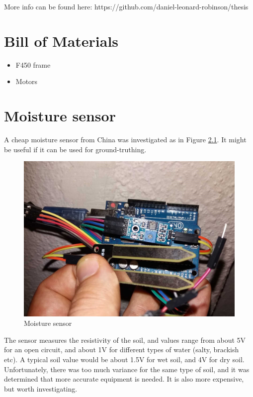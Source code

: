 \begin{appendices}

More info can be found here: https://github.com/daniel-leonard-robinson/thesis

\chapter{Bill of Materials}
\label{app:bom}

\begin{itemize}
	\item F450 frame
	\item Motors
\end{itemize}

\chapter{Moisture sensor}

A cheap moisture sensor from China was investigated as in Figure \ref{fig:moisture_sensor}. It might be useful if it can be used for ground-truthing.

\begin{figure}[H]
\centering
\includegraphics[scale=0.17]{images/moisture_sensor.jpg}
\caption{Moisture sensor}
\label{fig:moisture_sensor}
\end{figure}

The sensor measures the resistivity of the soil, and values range from about 5V for an open circuit, and about 1V for different types of water (salty, brackish etc). A typical soil value would be about 1.5V for wet soil, and 4V for dry soil. Unfortunately, there was too much variance for the same type of soil, and it was determined that more accurate equipment is needed. It is also more expensive, but worth investigating.


\end{appendices}
